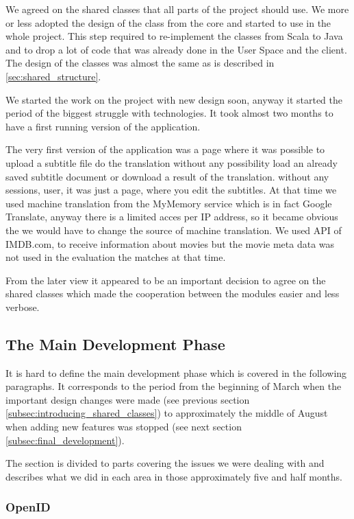 We agreed on the shared classes that all parts of the project should use.  We more or less adopted the design of the class from the core and started to use in the whole project. This step required to re-implement the classes from Scala to Java and to drop a lot of code that was already done in the User Space and the client. The design of the classes was almost the same as is described in \ref{sec:shared_structure}.

We started the work on the project with new design soon, anyway it started the period of the biggest struggle with technologies. It took almost two months to have a first running version of the application.

The very first version of the application was a page where it was possible to upload a subtitle file do the translation without any possibility load an already saved subtitle document or download a result of the translation. without any sessions, user, it was just a page, where you edit the subtitles. At that time we used machine translation from the MyMemory service which is in fact Google Translate, anyway there is a limited acces per IP address, so it became obvious the we would have to change the source of machine translation. We used API of IMDB.com, to receive information about movies but the movie meta data was not used in the evaluation the matches at that time.

From the later view it appeared to be an important decision to agree on the shared classes which made the cooperation between the modules easier and less verbose. 

\subsection{The Main Development Phase}

It is hard to define the main development phase which is covered in the following paragraphs. It corresponds to the period from the beginning of March when the important design changes were made (see previous section \ref{subsec:introducing_shared_classes}) to approximately the middle of August when adding new features was stopped (see next section \ref{subsec:final_development}).

The section is divided to parts covering the issues we were dealing with and describes what we did in each area in those approximately five and half months.

\subsubsection{OpenID}
\label{subsubsec:openid}

